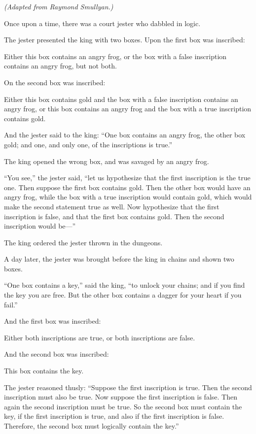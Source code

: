 
{
 \textit{(Adapted from Raymond
Smullyan.}\textit{}\textit{)} }

{
 Once upon a time, there was a court jester who dabbled in logic.}

{
 The jester presented the king with two boxes. Upon the first box
was inscribed:}

{
 Either this box contains an angry frog, or the box with a false
inscription contains an angry frog, but not both.}

{
 On the second box was inscribed:}

{
 Either this box contains gold and the box with a false inscription
contains an angry frog, or this box contains an angry frog and the box
with a true inscription contains gold.}

{
 And the jester said to the king: ``One box
contains an angry frog, the other box gold; and one, and only one, of
the inscriptions is true.''}

{
 The king opened the wrong box, and was savaged by an angry frog.}

{
 ``You see,'' the jester said,
``let us hypothesize that the first inscription is the
true one. Then suppose the first box contains gold. Then the other box
would have an angry frog, while the box with a true inscription would
contain gold, which would make the second statement true as well. Now
hypothesize that the first inscription is false, and that the first box
contains gold. Then the second inscription would
be---''}

{
 The king ordered the jester thrown in the dungeons.}

{
 A day later, the jester was brought before the king in chains and
shown two boxes.}

{
 ``One box contains a key,''
said the king, ``to unlock your chains; and if you
find the key you are free. But the other box contains a dagger for your
heart if you fail.''}

{
 And the first box was inscribed:}

{
 Either both inscriptions are true, or both inscriptions are
false.}

{
 And the second box was inscribed:}

{
 This box contains the key.}

{
 The jester reasoned thusly: ``Suppose the first
inscription is true. Then the second inscription must also be true. Now
suppose the first inscription is false. Then again the second
inscription must be true. So the second box must contain the key, if
the first inscription is true, and also if the first inscription is
false. Therefore, the second box must logically contain the
key.''}

